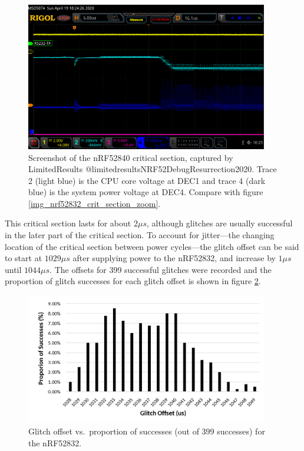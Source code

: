\begin{figure}
\centering
\includegraphics[width=4.16667in,height=\textheight]{res/nrf52832_limitedresults_crit_section.png}
\caption{Screenshot of the nRF52840 critical section, captured by
LimitedResults @limitedresultsNRF52DebugResurrection2020. Trace 2 (light
blue) is the CPU core voltage at DEC1 and trace 4 (dark blue) is the
system power voltage at DEC4. Compare with figure
\ref{img_nrf52832_crit_section_zoom}.\label{img_nrf52832_limitedresults_crit_section}}
\end{figure}

This critical section lasts for about \(2\mu s\), although glitches are
usually successful in the later part of the critical section. To account
for jitter---the changing location of the critical section between power
cycles---the glitch offset can be said to start at \(1029\mu s\) after
supplying power to the nRF52832, and increase by \(1\mu s\) until
\(1044\mu s\). The offsets for 399 successful glitches were recorded and
the proportion of glitch successes for each glitch offset is shown in
figure \ref{img_nrf52832_offset_vs_success}.

\begin{figure}
\centering
\includegraphics[width=4.16667in,height=\textheight]{res/nrf52832_offset_vs_success.png}
\caption{Glitch offset vs.~proportion of successes (out of 399
successes) for the nRF52832.\label{img_nrf52832_offset_vs_success}}
\end{figure}

